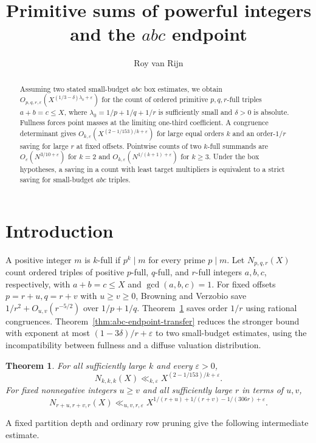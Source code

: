 \documentclass[11pt,reqno]{amsart}
\title[Primitive sums of powerful integers]{Primitive sums of powerful integers and the \(abc\) endpoint}
\author{Roy van Rijn}
\newtheorem{theorem}{Theorem}
\newcommand{\eps}{\varepsilon}
\begin{document}
\begin{abstract}
Assuming two stated small-budget \(abc\) box estimates, we obtain
\(O_{p,q,r,\eps}(X^{(1/3-\delta)\lambda_0+\eps})\) for the count of ordered primitive
\(p,q,r\)-full triples \(a+b=c\le X\), where
\(\lambda_0=1/p+1/q+1/r\) is sufficiently small and
\(\delta>0\) is absolute. Fullness forces point masses at the
limiting one-third coefficient.
A congruence determinant gives
\(O_{k,\eps}(X^{(2-1/153)/k+\eps})\) for large equal orders \(k\)
and an order-\(1/r\) saving for large \(r\) at fixed offsets.
Pointwise counts of two \(k\)-full summands are
\(O_\eps(N^{3/10+\eps})\) for \(k=2\) and \(O_{k,\eps}(N^{1/(k+1)+\eps})\)
for \(k\ge3\). Under the box hypotheses, a saving in a count with least
target multipliers is equivalent to a strict saving for small-budget \(abc\) triples.

\end{abstract}
\maketitle

\section{Introduction}
A positive integer \(m\) is \(k\)-full if \(p^k\mid m\) for every prime
\(p\mid m\). Let \(N_{p,q,r}(X)\) count ordered triples of positive \(p\)-full,
\(q\)-full, and \(r\)-full integers \(a,b,c\), respectively, with
\(a+b=c\le X\) and \(\gcd(a,b,c)=1\).
For fixed offsets \(p=r+u, q=r+v\) with \(u\ge v\ge0\), Browning and
Verzobio \cite[Theorem~1.1]{BV} save \(1/r^2+O_{u,v}(r^{-5/2})\)
over \(1/p+1/q\). Theorem~\ref{thm:adaptive-triples} saves order \(1/r\)
using rational congruences. Theorem~\ref{thm:abc-endpoint-transfer}
reduces the stronger bound with exponent at most \((1-3\delta)/r+\eps\)
to two small-budget estimates, using the incompatibility between fullness and a diffuse valuation distribution.

\begin{theorem}\label{thm:adaptive-triples}
For all sufficiently large \(k\) and every \(\eps>0\),
\[
 N_{k,k,k}(X)\ll_{k,\eps}X^{(2-1/153)/k+\eps}.
\]
For fixed nonnegative integers \(u\ge v\) and all sufficiently
large \(r\) in terms of \(u,v\),
\[
 N_{r+u,r+v,r}(X)\ll_{u,v,r,\eps}
 X^{1/(r+u)+1/(r+v)-1/(306r)+\eps}.
\]
\end{theorem}

A fixed partition depth and ordinary row pruning give the
following intermediate estimate.
\end{document}

